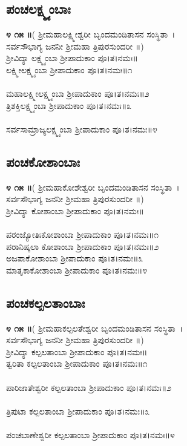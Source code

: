 \subsection{ಪಂಚಲಕ್ಷ್ಮ್ಯಂಬಾಃ}
{\bfseries ೪ ೧೫ ॥}( ಶ್ರೀಮಹಾಲಕ್ಷ್ಮೀಶ್ವರೀ ಬೃಂದಮಂಡಿತಾಸನ ಸಂಸ್ಥಿತಾ~।\\
ಸರ್ವಸೌಭಾಗ್ಯ ಜನನೀ ಶ್ರೀಮಹಾ ತ್ರಿಪುರಸುಂದರೀ ॥)\\
ಶ್ರೀವಿದ್ಯಾ ಲಕ್ಷ್ಮ್ಯಂಬಾ ಶ್ರೀಪಾದುಕಾಂ ಪೂ।ತ।ನಮಃ॥\\
ಲಕ್ಷ್ಮೀಲಕ್ಷ್ಮ್ಯಂಬಾ ಶ್ರೀಪಾದುಕಾಂ ಪೂ।ತ।ನಮಃ॥೧\\
\\ಮಹಾಲಕ್ಷ್ಮೀಲಕ್ಷ್ಮ್ಯಂಬಾ ಶ್ರೀಪಾದುಕಾಂ ಪೂ।ತ।ನಮಃ॥೨\\
ತ್ರಿಶಕ್ತಿಲಕ್ಷ್ಮ್ಯಂಬಾ ಶ್ರೀಪಾದುಕಾಂ ಪೂ।ತ।ನಮಃ॥೩\\
 \\ಸರ್ವಸಾಮ್ರಾಜ್ಯಲಕ್ಷ್ಮ್ಯಂಬಾ ಶ್ರೀಪಾದುಕಾಂ ಪೂ।ತ।ನಮಃ॥೪
\subsection{ಪಂಚಕೋಶಾಂಬಾಃ}
{\bfseries ೪ ೧೫ ॥}( ಶ್ರೀಮಹಾಕೋಶೇಶ್ವರೀ ಬೃಂದಮಂಡಿತಾಸನ ಸಂಸ್ಥಿತಾ~।\\
ಸರ್ವಸೌಭಾಗ್ಯ ಜನನೀ ಶ್ರೀಮಹಾ ತ್ರಿಪುರಸುಂದರೀ ॥)\\
ಶ್ರೀವಿದ್ಯಾ ಕೋಶಾಂಬಾ ಶ್ರೀಪಾದುಕಾಂ ಪೂ।ತ।ನಮಃ॥\\
\\ ಪರಂಜ್ಯೋತಿಃಕೋಶಾಂಬಾ ಶ್ರೀಪಾದುಕಾಂ ಪೂ।ತ।ನಮಃ॥೧\\
 ಪರಾನಿಷ್ಕಲಾ ಕೋಶಾಂಬಾ ಶ್ರೀಪಾದುಕಾಂ ಪೂ।ತ।ನಮಃ॥೨\\
ಅಜಪಾಕೋಶಾಂಬಾ ಶ್ರೀಪಾದುಕಾಂ ಪೂ।ತ।ನಮಃ॥೩\\
 ಮಾತೃಕಾಕೋಶಾಂಬಾ ಶ್ರೀಪಾದುಕಾಂ ಪೂ।ತ।ನಮಃ॥೪
\subsection{ಪಂಚಕಲ್ಪಲತಾಂಬಾಃ}
{\bfseries ೪ ೧೫ ॥}( ಶ್ರೀಮಹಾಕಲ್ಪಲತೇಶ್ವರೀ ಬೃಂದಮಂಡಿತಾಸನ ಸಂಸ್ಥಿತಾ~।\\
ಸರ್ವಸೌಭಾಗ್ಯ ಜನನೀ ಶ್ರೀಮಹಾ ತ್ರಿಪುರಸುಂದರೀ ॥)\\
ಶ್ರೀವಿದ್ಯಾ ಕಲ್ಪಲತಾಂಬಾ ಶ್ರೀಪಾದುಕಾಂ ಪೂ।ತ।ನಮಃ॥\\
 ತ್ವರಿತಾ ಕಲ್ಪಲತಾಂಬಾ ಶ್ರೀಪಾದುಕಾಂ ಪೂ।ತ।ನಮಃ॥೧\\
\\ಪಾರಿಜಾತೇಶ್ವರೀ ಕಲ್ಪಲತಾಂಬಾ ಶ್ರೀಪಾದುಕಾಂ ಪೂ।ತ।ನಮಃ॥೨\\
\\ ತ್ರಿಪುಟಾ ಕಲ್ಪಲತಾಂಬಾ ಶ್ರೀಪಾದುಕಾಂ ಪೂ।ತ।ನಮಃ॥೩\\
\\ ಪಂಚಬಾಣೇಶ್ವರೀ ಕಲ್ಪಲತಾಂಬಾ ಶ್ರೀಪಾದುಕಾಂ ಪೂ।ತ।ನಮಃ॥೪
